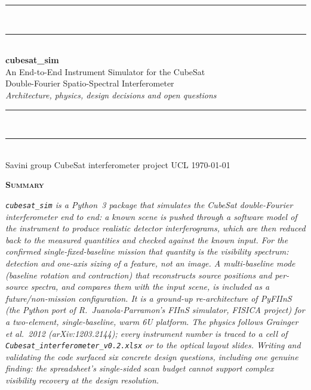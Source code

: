\documentclass[11pt]{article}
\newcommand{\code}[1]{\texttt{\small #1}}
\begin{document}
\begin{center}
{\color{plummid}\rule{\textwidth}{2.4pt}}\\[2.5pt]
{\color{plumrule}\rule{\textwidth}{0.6pt}}\\[16pt]
{\sffamily\bfseries\color{plumdark}\Huge cubesat\_sim}\\[10pt]
{\sffamily\Large\color{plummid} An End-to-End Instrument Simulator for the
 CubeSat\\[3pt] Double-Fourier Spatio-Spectral Interferometer}\\[8pt]
{\itshape\normalsize\color{ink} Architecture, physics, design decisions and
 open questions}\\[14pt]
{\color{plumrule}\rule{\textwidth}{0.6pt}}\\[2.5pt]
{\color{plummid}\rule{\textwidth}{2.4pt}}\\[9pt]
{\sffamily\small\color{plumdark!75} Savini group CubeSat interferometer
 project \;\textcolor{plummid}{\textbullet}\; UCL \;\textcolor{plummid}{\textbullet}\; \today}
\end{center}
\vspace{1.0em}

\begin{tcolorbox}[enhanced, breakable, sharp corners, boxrule=0pt, leftrule=2.6pt,
  colframe=plummid, colback=plumtint2, left=13pt, right=13pt, top=8pt, bottom=9pt]
{\sffamily\bfseries\color{plumdark}\textsc{Summary}}\par\smallskip\small\itshape
\code{cubesat\_sim} is a Python~3 package that simulates the CubeSat
double-Fourier interferometer end to end: a known scene is pushed through a
software model of the instrument to produce realistic detector interferograms,
which are then reduced back to the measured quantities and checked against the
known input. For the confirmed single-fixed-baseline mission that quantity is
the visibility spectrum: detection and one-axis sizing of a feature, not an
image. A multi-baseline mode (baseline rotation and contraction) that
reconstructs source positions and per-source spectra, and compares them with
the input scene, is included as a future/non-mission configuration. It is a
ground-up re-architecture of PyFIInS (the Python port of
R.~Juanola-Parramon's FIInS simulator, FISICA project) for a two-element,
single-baseline, warm 6U platform. The physics follows Grainger et al.\ 2012
(arXiv:1203.2144); every instrument number is traced to a cell of
\code{Cubesat\_interferometer\_v0.2.xlsx} or to the optical layout slides.
Writing and validating the code surfaced six concrete design questions,
including one genuine finding: the spreadsheet's single-sided scan budget
cannot support complex visibility recovery at the design resolution.
\end{tcolorbox}
\end{document}
